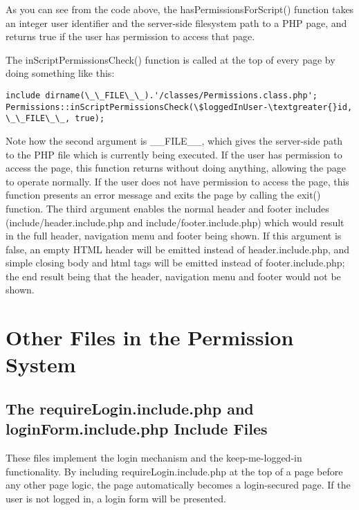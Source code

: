 \documentclass[letterpaper,10pt,english]{sphinxmanual}
\begin{document}
As you can see from the code above, the hasPermissionsForScript() function takes an integer user
identifier and the server-side filesystem path to a PHP page, and returns true if the user has
permission to access that page.

The inScriptPermissionsCheck() function is called at the top of every page by doing something like this:

\begin{Verbatim}[commandchars=\\\{\}]
include dirname(\_\_FILE\_\_).'/classes/Permissions.class.php';
Permissions::inScriptPermissionsCheck(\$loggedInUser-\textgreater{}id, \_\_FILE\_\_, true);
\end{Verbatim}

Note how the second argument is \_\_FILE\_\_, which gives the server-side path to the PHP file which is
currently being executed.  If the user has permission to access the page, this function returns
without doing anything, allowing the page to operate normally.  If the user does not have permission
to access the page, this function presents an error message and exits the page by calling the exit()
function.  The third argument enables the normal header and footer includes
(include/header.include.php and include/footer.include.php) which would result in the full header,
navigation menu and footer being shown.  If this argument is false, an empty HTML header will be
emitted instead of header.include.php, and simple closing body and html tags will be emitted instead
of footer.include.php; the end result being that the header, navigation menu and footer would not be
shown.


\section{Other Files in the Permission System}
\label{jaxFrameworkGuide:other-files-in-the-permission-system}

\subsection{The requireLogin.include.php and loginForm.include.php Include Files}
\label{jaxFrameworkGuide:the-requirelogin-include-php-and-loginform-include-php-include-files}
These files implement the login mechanism and the keep-me-logged-in functionality.  By including
requireLogin.include.php at the top of a page before any other page logic, the page automatically
becomes a login-secured page.  If the user is not logged in, a login form will be presented.
\end{document}
